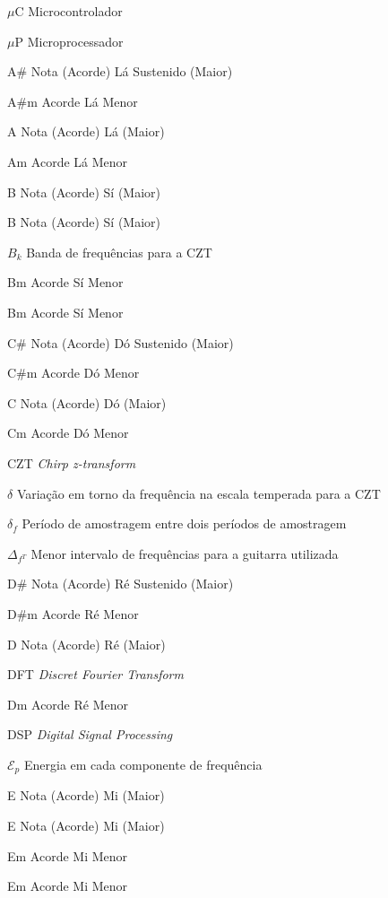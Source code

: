 \begin{siglas}
  \item[$\mu$C] Microcontrolador
  \item[$\mu$P] Microprocessador
  \item[A\#]   Nota (Acorde) Lá Sustenido  (Maior)
  \item[A\#m]  Acorde Lá Menor
  \item[A]     Nota (Acorde) Lá (Maior)
  \item[Am]    Acorde Lá Menor
  \item[B]     Nota (Acorde) Sí  (Maior)
  \item[B]     Nota (Acorde) Sí (Maior)
  \item[$B_k$] Banda de frequências para a CZT
  \item[Bm]    Acorde Sí Menor
  \item[Bm]    Acorde Sí Menor
  \item[C\#]   Nota (Acorde) Dó Sustenido  (Maior)
  \item[C\#m]  Acorde Dó Menor
  \item[C]     Nota (Acorde) Dó (Maior)
  \item[Cm]    Acorde Dó Menor
  \item[CZT]   \textit{Chirp z-transform}
  \item[$\delta$] Variação em torno da frequência na escala temperada para a CZT
  \item[$\delta_{f}$] Período de amostragem entre dois períodos de amostragem
  \item[$\Delta_{f^T}$] Menor intervalo de frequências para a guitarra utilizada 
  \item[D\#]   Nota (Acorde) Ré Sustenido (Maior)
  \item[D\#m]  Acorde Ré Menor
  \item[D]     Nota (Acorde) Ré (Maior)
  \item[DFT]   \textit{Discret Fourier Transform}
  \item[Dm]    Acorde Ré Menor
  \item[DSP]   \textit{Digital Signal Processing}
  \item[$\mathcal{E}_p$] Energia em cada componente de frequência
  \item[E]     Nota (Acorde) Mi (Maior)
  \item[E]     Nota (Acorde) Mi (Maior)
  \item[Em]    Acorde Mi Menor
  \item[Em]    Acorde Mi Menor

\end{siglas}
